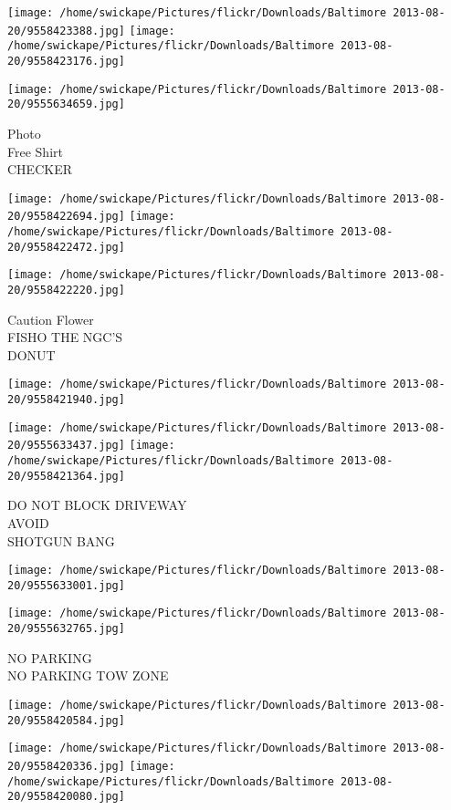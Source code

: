\documentclass[10pt,letterpaper]{article}
\begin{document}
\texttt{[image: /home/swickape/Pictures/flickr/Downloads/Baltimore 2013-08-20/9558423388.jpg]}
\texttt{[image: /home/swickape/Pictures/flickr/Downloads/Baltimore 2013-08-20/9558423176.jpg]}

\vspace{0.25in}
\texttt{[image: /home/swickape/Pictures/flickr/Downloads/Baltimore 2013-08-20/9555634659.jpg]}

Photo\\
Free Shirt\\
CHECKER
\pagebreak

\texttt{[image: /home/swickape/Pictures/flickr/Downloads/Baltimore 2013-08-20/9558422694.jpg]}
\texttt{[image: /home/swickape/Pictures/flickr/Downloads/Baltimore 2013-08-20/9558422472.jpg]}

\texttt{[image: /home/swickape/Pictures/flickr/Downloads/Baltimore 2013-08-20/9558422220.jpg]}

Caution Flower\\
FISHO THE NGC'S\\
DONUT
\pagebreak

\texttt{[image: /home/swickape/Pictures/flickr/Downloads/Baltimore 2013-08-20/9558421940.jpg]}

\vspace{0.25in}
\texttt{[image: /home/swickape/Pictures/flickr/Downloads/Baltimore 2013-08-20/9555633437.jpg]}
\texttt{[image: /home/swickape/Pictures/flickr/Downloads/Baltimore 2013-08-20/9558421364.jpg]}

DO NOT BLOCK DRIVEWAY\\
AVOID\\
SHOTGUN BANG
\pagebreak

\texttt{[image: /home/swickape/Pictures/flickr/Downloads/Baltimore 2013-08-20/9555633001.jpg]}

\vspace{0.25in}
\texttt{[image: /home/swickape/Pictures/flickr/Downloads/Baltimore 2013-08-20/9555632765.jpg]}

NO PARKING\\
NO PARKING TOW ZONE
\pagebreak

\texttt{[image: /home/swickape/Pictures/flickr/Downloads/Baltimore 2013-08-20/9558420584.jpg]}

\vspace{0.25in}
\texttt{[image: /home/swickape/Pictures/flickr/Downloads/Baltimore 2013-08-20/9558420336.jpg]}
\texttt{[image: /home/swickape/Pictures/flickr/Downloads/Baltimore 2013-08-20/9558420080.jpg]}
\end{document}
